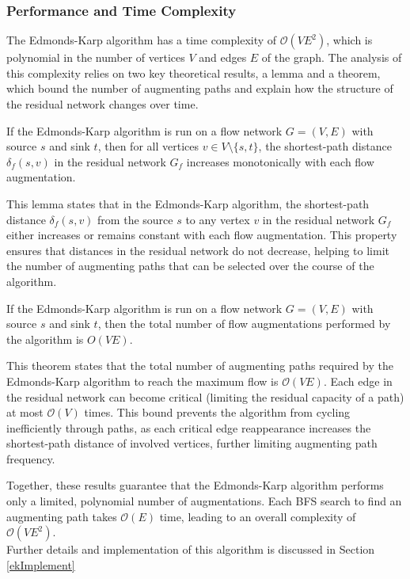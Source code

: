 \subsubsection*{Performance and Time Complexity}

The Edmonds-Karp algorithm has a time complexity of \(\mathcal{O}(VE^2)\), which is polynomial in the number of vertices \( V \) and edges \( E \) of the graph. The analysis of this complexity relies on two key theoretical results, a lemma and a theorem, which bound the number of augmenting paths and explain how the structure of the residual network changes over time.

\begin{lemma}
If the Edmonds-Karp algorithm is run on a flow network \( G = (V, E) \) with source \( s \) and sink \( t \), then for all vertices \( v \in V \setminus \{s, t\} \), the shortest-path distance \( \delta_f(s, v) \) in the residual network \( G_f \) increases monotonically with each flow augmentation.
\end{lemma}
This lemma states that in the Edmonds-Karp algorithm, the shortest-path distance \( \delta_f(s, v) \) from the source \( s \) to any vertex \( v \) in the residual network \( G_f \) either increases or remains constant with each flow augmentation. This property ensures that distances in the residual network do not decrease, helping to limit the number of augmenting paths that can be selected over the course of the algorithm.

\begin{theorem}
    If the Edmonds-Karp algorithm is run on a flow network \( G = (V, E) \) with source \( s \) and sink \( t \), then the total number of flow augmentations performed by the algorithm is \( O(VE) \).
\end{theorem}
This theorem states that the total number of augmenting paths required by the Edmonds-Karp algorithm to reach the maximum flow is \(\mathcal{O}(VE)\). Each edge in the residual network can become critical (limiting the residual capacity of a path) at most \(\mathcal{O}(V)\) times. This bound prevents the algorithm from cycling inefficiently through paths, as each critical edge reappearance increases the shortest-path distance of involved vertices, further limiting augmenting path frequency.

Together, these results guarantee that the Edmonds-Karp algorithm performs only a limited, polynomial number of augmentations. Each BFS search to find an augmenting path takes \( \mathcal{O}(E) \) time, leading to an overall complexity of \( \mathcal{O}(VE^2) \).\\

\noindent Further details and implementation of this algorithm is discussed in Section \ref{ekImplement}
